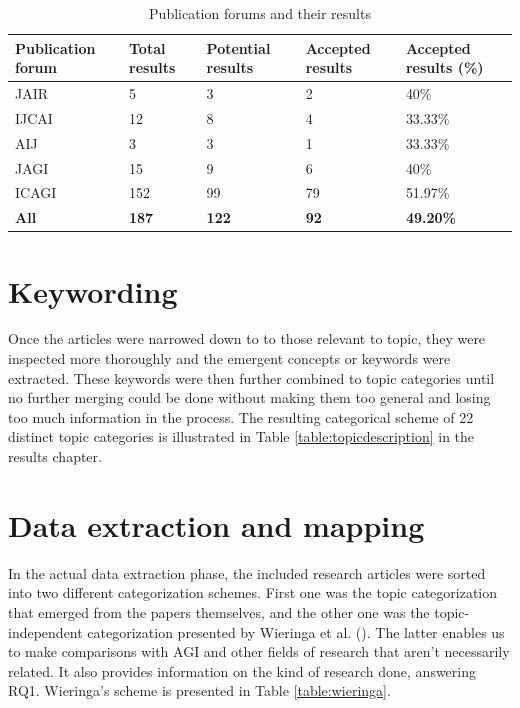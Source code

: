 \documentclass[utf8,english]{gradu3}
\begin{document}
  \begin{table}[H]
    \footnotesize
    \centering
    \begin{tabular}{|l|l|l|l|l|}
      \hline
      \textbf{Publication forum}  & \textbf{Total results} & \textbf{Potential results} & \textbf{Accepted results} & \textbf{Accepted results (\%)} \\ \hline
      JAIR   & 5   & 3  & 2  & 40\%  \\ \hline
      IJCAI  & 12  & 8  & 4  & 33.33\%  \\ \hline
      AIJ    & 3   & 3  & 1   & 33.33\%  \\ \hline
      JAGI   & 15  & 9  & 6   & 40\%  \\ \hline
      ICAGI  & 152 & 99 & 79  & 51.97\%  \\ \hline
      \textbf{All} & \textbf{187} & \textbf{122}  & \textbf{92}  & \textbf{49.20\%}  \\ \hline
    \end{tabular}
    \caption{Publication forums and their results}
    \label{table:forumtable}
  \end{table}

\section{Keywording}
Once the articles were narrowed down to to those relevant to topic, they were
inspected more thoroughly and the emergent concepts or keywords were extracted.
These keywords were then further combined to topic categories until no further
merging could be done without making them too general and losing too much
information in the process. The resulting categorical scheme of 22 distinct
topic categories is illustrated in Table \ref{table:topicdescription} in the
results chapter.  

\section{Data extraction and mapping}

In the actual data extraction phase, the included research articles were sorted
into two different categorization schemes. First one was the topic
categorization that emerged from the papers themselves, and the other one was
the topic-independent categorization presented by Wieringa et al.
(\cite*{wieringa2006}). The latter enables us to make comparisons with AGI and
other fields of research that aren't necessarily related. It also provides
information on the kind of research done, answering RQ1. Wieringa's scheme is
presented in Table \ref{table:wieringa}.
\end{document}
